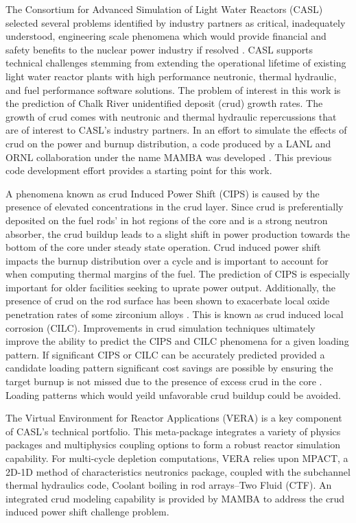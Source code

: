 
The Consortium for Advanced Simulation of Light Water Reactors (CASL) selected several problems identified by industry partners as critical, inadequately understood, engineering scale phenomena which would provide
financial and safety benefits to the nuclear power industry if resolved \cite{Turinsky15}.  CASL supports technical challenges stemming from extending the operational lifetime of existing light water reactor plants with high performance neutronic, thermal hydraulic, and fuel performance software solutions.
The problem of
interest in this work is the prediction of Chalk River unidentified deposit
(crud) growth rates.  The growth of crud comes with neutronic and thermal
hydraulic repercussions that are of interest to CASL's industry partners.
In an effort to simulate the
effects of crud on the power and burnup distribution, a code produced by a LANL
and ORNL collaboration under the name MAMBA was developed  \cite{collins16}.
This previous code development effort provides a starting point for this work.
 

A phenomena known as crud Induced Power Shift (CIPS) is caused by the presence
of elevated  concentrations in the crud layer.  Since crud is preferentially
deposited on the fuel rods' in hot regions of the core and  is a strong neutron absorber, the crud buildup leads to a slight shift in
power production towards the bottom of the core under steady state operation.
Crud induced power shift impacts the burnup distribution over a cycle
and is important to account for when computing thermal
margins of the fuel.  The prediction
of CIPS is especially important for older facilities seeking to uprate power
output.  Additionally, the presence of crud on the rod surface has been shown
to exacerbate local oxide penetration rates of some zirconium alloys \cite{adamson07}.
This is known as crud induced local corrosion (CILC).  Improvements in crud
simulation techniques ultimately improve the ability to predict the CIPS and
CILC phenomena for a given loading pattern.  If significant CIPS or CILC can be accurately predicted provided a candidate loading pattern significant cost savings are possible by ensuring the target burnup is not missed due to the presence of excess crud in the core \cite{lange2017}.  Loading patterns which would yeild unfavorable crud buildup could be avoided.
  

The Virtual Environment for Reactor Applications (VERA) is a key component of
CASL's technical portfolio.  This meta-package integrates a variety of physics
packages and multiphysics coupling options to form a robust reactor simulation
capability.  For multi-cycle depletion computations, VERA relies upon MPACT, a
2D-1D method of characteristics neutronics package, coupled with the subchannel
thermal hydraulics code, Coolant boiling in rod arrays–Two Fluid (CTF).   
An integrated crud modeling capability
is provided by MAMBA to address the crud induced power shift challenge problem.

